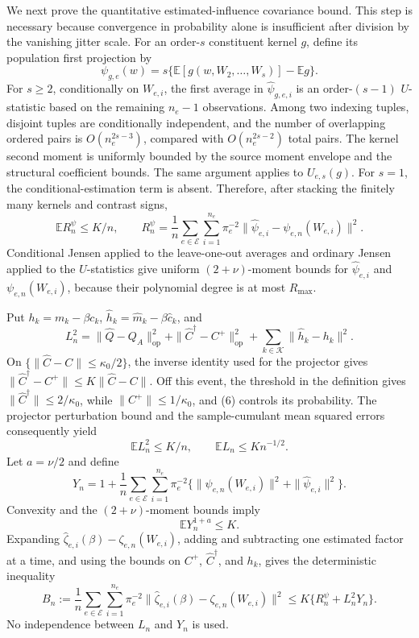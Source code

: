 We next prove the quantitative estimated-influence covariance bound.  This step is necessary because convergence in probability alone is insufficient after division by the vanishing jitter scale.  For an order-\(s\) constituent kernel \(g\), define its population first projection by
\[
 \psi_{g,e}(w)=s\{\mathbb E[g(w,W_2,\ldots,W_s)]-\mathbb Eg\}.
\]
For \(s\geq2\), conditionally on \(W_{e,i}\), the first average in \(\widehat\psi_{g,e,i}\) is an order-\((s-1)\) \(U\)-statistic based on the remaining \(n_e-1\) observations.  Among two indexing tuples, disjoint tuples are conditionally independent, and the number of overlapping ordered pairs is \(O(n_e^{2s-3})\), compared with \(O(n_e^{2s-2})\) total pairs.  The kernel second moment is uniformly bounded by the source moment envelope and the structural coefficient bounds.  The same argument applies to \(U_{e,s}(g)\).  For \(s=1\), the conditional-estimation term is absent.  Therefore, after stacking the finitely many kernels and contrast signs,
\[
 \mathbb E R_n^\psi\leq K/n,
 \qquad
 R_n^\psi=\frac1n\sum_{e\in\mathcal E}\sum_{i=1}^{n_e}\pi_e^{-2}
 \|\widehat\psi_{e,i}-\psi_{e,n}(W_{e,i})\|^2. \tag{9}
\]
Conditional Jensen applied to the leave-one-out averages and ordinary Jensen applied to the \(U\)-statistics give uniform \((2+\nu)\)-moment bounds for \(\widehat\psi_{e,i}\) and \(\psi_{e,n}(W_{e,i})\), because their polynomial degree is at most \(R_{\max}\).

Put \(h_k=m_k-\beta c_k\), \(\widehat h_k=\widehat m_k-\beta\widehat c_k\), and
\[
 L_n^2=\|\widehat Q-Q_A\|_{\mathrm{op}}^2
 +\|\widehat C^\dagger-C^+\|_{\mathrm{op}}^2
 +\sum_{k\in\mathcal K}\|\widehat h_k-h_k\|^2. \tag{10}
\]
On \(\{\|\widehat C-C\|\leq\kappa_0/2\}\), the inverse identity used for the projector gives \(\|\widehat C^\dagger-C^+\|\leq K\|\widehat C-C\|\).  Off this event, the threshold in the definition gives \(\|\widehat C^\dagger\|\leq2/\kappa_0\), while \(\|C^+\|\leq1/\kappa_0\), and (6) controls its probability.  The projector perturbation bound and the sample-cumulant mean squared errors consequently yield
\[
 \mathbb E L_n^2\leq K/n,
 \qquad
 \mathbb E L_n\leq K n^{-1/2}. \tag{11}
\]
Let \(a=\nu/2\) and define
\[
 Y_n=1+\frac1n\sum_{e\in\mathcal E}\sum_{i=1}^{n_e}\pi_e^{-2}
 \{\|\psi_{e,n}(W_{e,i})\|^2+\|\widehat\psi_{e,i}\|^2\}.
\]
Convexity and the \((2+\nu)\)-moment bounds imply
\[
 \mathbb E Y_n^{1+a}\leq K. \tag{12}
\]
Expanding \(\widehat\zeta_{e,i}(\beta)-\zeta_{e,n}(W_{e,i})\), adding and subtracting one estimated factor at a time, and using the bounds on \(C^+\), \(\widehat C^\dagger\), and \(h_k\), gives the deterministic inequality
\[
 B_n:=\frac1n\sum_{e\in\mathcal E}\sum_{i=1}^{n_e}\pi_e^{-2}
 \|\widehat\zeta_{e,i}(\beta)-\zeta_{e,n}(W_{e,i})\|^2
 \leq K\{R_n^\psi+L_n^2Y_n\}. \tag{13}
\]
No independence between \(L_n\) and \(Y_n\) is used.

